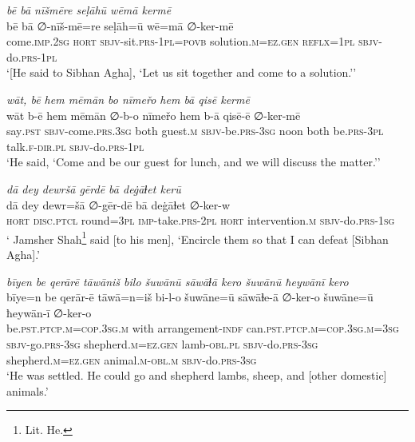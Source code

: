 \ea \label{DP.39}
\textit{bē bā nīšmēre seḷāhū wēmā kermē} \\ 
\gll bē bā ∅-nīš-mē=re seḷāh=ū wē=mā ∅-ker-mē \\ 
 come\textsc{.imp}\textsc{.\textsc{2sg}} \textsc{hort} \textsc{sbjv-}sit\textsc{.prs}\textsc{-1pl}\textsc{=\textsc{povb}} solution\textsc{.m}\textsc{=ez}\textsc{.gen} \textsc{reflx}\textsc{=1pl} \textsc{sbjv-}do\textsc{.prs}\textsc{-1pl} \\ 
\glt `[He said to Sibhan Agha], ‘Let us sit together and come to a solution.’'
\z 
 
\ea \label{DP.44}
\textit{wāt, bē hem mēmān bo nīmeřo hem bā qisē kermē} \\ 
\gll wāt b-ē hem mēmān ∅-b-o nīmeřo hem b-ā qisē-ē ∅-ker-mē \\ 
 say\textsc{.pst} \textsc{sbjv-}come\textsc{.prs}\textsc{.3sg} both guest\textsc{.m} \textsc{sbjv-}be\textsc{.prs}\textsc{-3sg} noon both be\textsc{.prs}\textsc{-3pl} talk\textsc{\textsc{.f}}\textsc{-dir}\textsc{.pl} \textsc{sbjv-}do\textsc{.prs}\textsc{-1pl} \\ 
\glt `He said, ‘Come and be our guest for lunch, and we will discuss the matter.’'
\z 
 
\ea \label{DP.51}
\textit{dā dey dewršā gērdē bā deġāɫet kerū} \\ 
\gll dā dey dewr=šā ∅-gēr-dē bā deġāɫet ∅-ker-w \\ 
 \textsc{hort} \textsc{disc.ptcl} round\textsc{=3pl} \textsc{imp-}take\textsc{.prs}\textsc{-2pl} \textsc{hort} intervention\textsc{.m} \textsc{sbjv-}do\textsc{.prs}\textsc{-1sg} \\ 
\glt ` Jamsher Shah\footnote{Lit. He.} said [to his men], ‘Encircle them so that I can defeat [Sibhan Agha].'
\z 
 
\ea \label{ZP.9}
\textit{bīyen be qerārē tāwāniš bilo šuwānū sāwāɫā kero šuwānū ħeywānī kero} \\ 
\gll bīye=n be qerār-ē tāwā=n=iš bi-l-o šuwāne=ū sāwāɫe-ā ∅-ker-o šuwāne=ū ħeywān-ī ∅-ker-o \\ 
 be\textsc{.pst}\textsc{.ptcp}\textsc{.m}\textsc{=cop}\textsc{.3sg}\textsc{.m} with arrangement\textsc{-indf} can\textsc{.pst}\textsc{.ptcp}\textsc{.m}\textsc{=cop}\textsc{.3sg}\textsc{.m}\textsc{=3sg} \textsc{sbjv-}go\textsc{.prs}\textsc{-3sg} shepherd\textsc{.m}\textsc{\textsc{=ez.gen}} lamb\textsc{-obl}\textsc{.pl} \textsc{sbjv-}do\textsc{.prs}\textsc{-3sg} shepherd\textsc{.m}\textsc{\textsc{=ez.gen}} animal\textsc{.m}\textsc{-obl}\textsc{.m} \textsc{sbjv-}do\textsc{.prs}\textsc{-3sg} \\ 
\glt `He was settled. He could go and shepherd lambs, sheep, and [other domestic] animals.'
\z 
 
